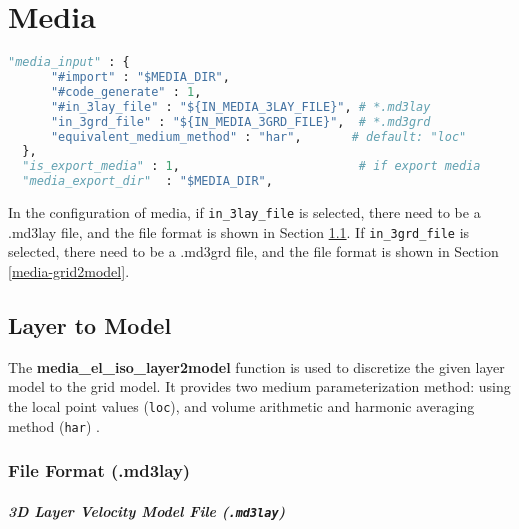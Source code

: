 \chapter{Media}\label{chapter-media}

\begin{lstlisting}[language=python, title=run\_test.sh, frame=tb]
  "media_input" : {
      "#import" : "$MEDIA_DIR", 
      "#code_generate" : 1,   
      "#in_3lay_file" : "${IN_MEDIA_3LAY_FILE}", # *.md3lay
      "in_3grd_file" : "${IN_MEDIA_3GRD_FILE}",  # *.md3grd
      "equivalent_medium_method" : "har",       # default: "loc"
  },
  "is_export_media" : 1,                         # if export media                   
  "media_export_dir"  : "$MEDIA_DIR",                   
\end{lstlisting}

In the configuration of media, if \texttt{in\_3lay\_file} is selected, there need to be a .md3lay file, and the file format is shown in Section \ref{media-layer2model}. If \texttt{in\_3grd\_file} is selected, there need to be a .md3grd file, and the file format is shown in Section \ref{media-grid2model}.

\section{Layer to Model} \label{media-layer2model}
The \textbf{media\_el\_iso\_layer2model} function is used to discretize the given layer model to the grid model. It provides two medium parameterization method: using the local point values (\texttt{loc}), and volume arithmetic and harmonic averaging method (\texttt{har}) \citep{moczo_3d_2002,moczo_finite-difference_2014}.

\subsection{File Format (.md3lay)}

\paragraph{3D Layer Velocity Model File (\texttt{.md3lay})\\}~

